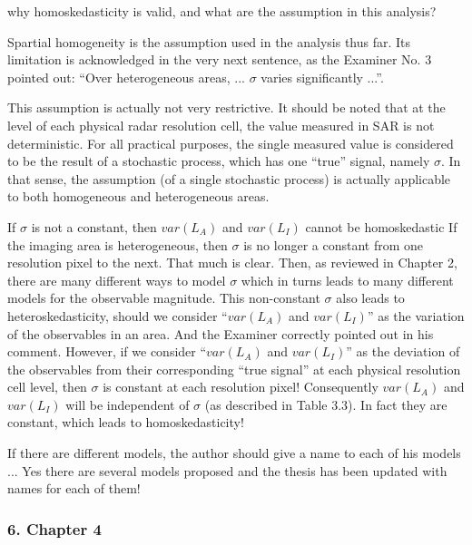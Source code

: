 \replyToComment
    {why homoskedasticity is valid, and what are the assumption in this analysis?}
    {Spartial homogeneity is the assumption used in the analysis thus far. 
Its limitation is acknowledged in the very next sentence, as the Examiner No. 3 pointed out: ``Over heterogeneous areas, ... $\sigma$ varies significantly ...''.

This assumption is actually not very restrictive.
It should be noted that at the level of each physical radar resolution cell, the value measured in SAR is not deterministic.
For all practical purposes, the single measured value is considered to be the result of a stochastic process, which has one ``true'' signal, namely $\sigma$.
In that sense, the assumption (of a single stochastic process) is actually applicable to both homogeneous and heterogeneous areas. 
}

\replyToComment
    {If $\sigma$ is not a constant, then $var(L_A)$ and $var(L_I)$ cannot be homoskedastic}
    {If the imaging area is heterogeneous, then $\sigma$ is no longer a constant from one resolution pixel to the next.
That much is clear.
Then, as reviewed in Chapter 2, there are many different ways to model $\sigma$ which in turns leads to many different models for the observable magnitude.
This non-constant $\sigma$ also leads to heteroskedasticity, 
  should we consider ``$var(L_A)$ and $var(L_I)$'' as the variation of the observables in an area.
And the Examiner correctly pointed out in his comment. 
However, if we consider ``$var(L_A)$ and $var(L_I)$'' as the deviation of the observables from their corresponding ``true signal'' at each physical resolution cell level, 
  then $\sigma$ is constant at each resolution pixel!
Consequently $var(L_A)$ and $var(L_I)$ will be independent of $\sigma$ (as described in Table 3.3).
In fact they are constant, which leads to homoskedasticity!
}

\replyToComment
    {If there are different models, the author should give a name to each of his models ...}
    {Yes there are several models proposed and the thesis has been updated with names for each of them!}

\subsubsection*{6. Chapter 4}

